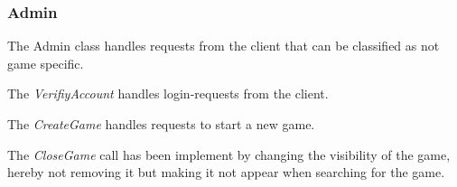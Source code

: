 \subsubsection{Admin}
\label{sec:adminimpl}
The Admin class handles requests from the client that can be classified as not game specific. 

The \textit{VerifiyAccount} handles login-requests from the client.

The \textit{CreateGame} handles requests to start a new game.

The \textit{CloseGame} call has been implement by changing the visibility of the game, hereby not removing it but making it not appear when searching for the game. 